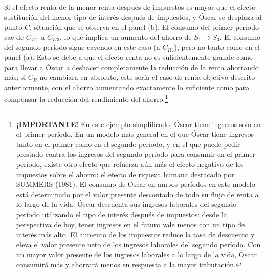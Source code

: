 \documentclass[10pt,a4paper]{article}
\begin{document}
Si el efecto renta de la menor renta después de impuestos es mayor que el efecto sustitución del menor tipo de interés después de impuestos, y Óscar se desplaza al punto $C$, situación que se observa en el panel (b). El consumo del primer período cae de $C_{W1}$ a $C_{W3}$, lo que implica un aumento del ahorro de $S_1 \to S_3$. El consumo del segundo período sigue cayendo en este caso (a $C_{R3}$), pero no tanto como en el panel (a). Esto se debe a que el efecto renta no es suficientemente grande como para llevar a Óscar a deshacer completamente la reducción de la renta ahorrando más; si $C_R$ no cambiara en absoluto, este sería el caso de renta objetivo descrito anteriormente, con el ahorro aumentando exactamente lo suficiente como para compensar la reducción del rendimiento del ahorro.\footnote{%
    \textbf{¡IMPORTANTE!} En este ejemplo simplificado, Óscar tiene ingresos solo en el primer período. En un modelo más general en el que Óscar tiene ingresos tanto en el primer como en el segundo período, y en el que puede pedir prestado contra los ingresos del segundo período para consumir en el primer período, existe otro efecto que refuerza aún más el efecto negativo de los impuestos sobre el ahorro: el efecto de riqueza humana destacado por SUMMERS (1981). El consumo de Óscar en ambos períodos en este modelo está determinado por el valor presente descontado de todo su flujo de renta a lo largo de la vida. Óscar descuenta sus ingresos laborales del segundo período utilizando el tipo de interés después de impuestos: desde la perspectiva de hoy, tener ingresos en el futuro vale menos con un tipo de interés más alto. El aumento de los impuestos reduce la tasa de descuento y eleva el valor presente neto de los ingresos laborales del segundo período. Con un mayor valor presente de los ingresos laborales a lo largo de la vida, Óscar consumirá más y ahorrará menos en respuesta a la mayor tributación.
}
\end{document}
